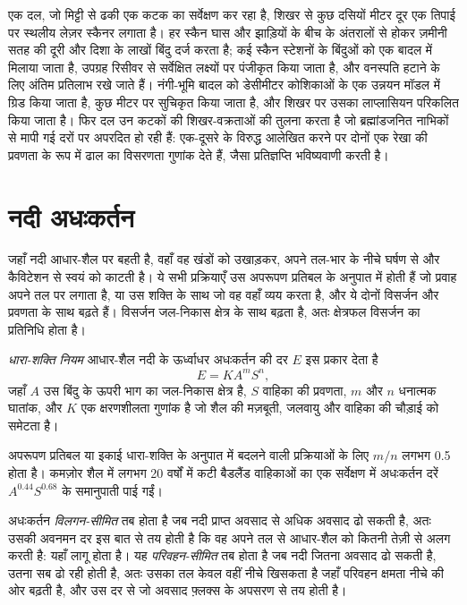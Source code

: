 \begin{inthefield}[एक ढाल का स्कैन]
एक दल, जो मिट्टी से ढकी एक कटक का सर्वेक्षण कर रहा है, शिखर से कुछ दसियों
मीटर दूर एक तिपाई पर स्थलीय लेज़र स्कैनर लगाता है। हर स्कैन घास और झाड़ियों के बीच के
अंतरालों से होकर ज़मीनी सतह की दूरी और दिशा के लाखों बिंदु दर्ज करता है;
कई स्कैन स्टेशनों के बिंदुओं को एक बादल में मिलाया जाता है,
उपग्रह रिसीवर से सर्वेक्षित लक्ष्यों पर पंजीकृत किया जाता है,
और वनस्पति हटाने के लिए अंतिम प्रतिलाभ रखे जाते हैं। नंगी-भूमि बादल को
डेसीमीटर कोशिकाओं के एक उन्नयन मॉडल में ग्रिड किया जाता है, कुछ मीटर पर सुचिकृत किया जाता है,
और शिखर पर उसका लाप्लासियन परिकलित किया जाता है। फिर दल उन कटकों की शिखर-वक्रताओं की
तुलना करता है जो ब्रह्मांडजनित नाभिकों से मापी गई दरों पर अपरदित हो रही हैं:
एक-दूसरे के विरुद्ध आलेखित करने पर दोनों एक रेखा की प्रवणता के रूप में
ढाल का विसरणता गुणांक देते हैं, जैसा प्रतिज्ञप्ति भविष्यवाणी करती है।
\end{inthefield}

\section{नदी अधःकर्तन}\label{sec:b3:quantitative-geomorphology:rivers}

जहाँ नदी आधार-शैल पर बहती है, वहाँ वह खंडों को उखाड़कर, अपने तल-भार के नीचे
घर्षण से और कैविटेशन से स्वयं को काटती है। ये सभी प्रक्रियाएँ उस अपरूपण प्रतिबल
के अनुपात में होती हैं जो प्रवाह अपने तल पर लगाता है, या उस शक्ति के साथ
जो वह वहाँ व्यय करता है, और ये दोनों विसर्जन और प्रवणता के साथ बढ़ते हैं।
विसर्जन जल-निकास क्षेत्र के साथ बढ़ता है, अतः क्षेत्रफल विसर्जन का प्रतिनिधि होता है।

\begin{definition}[धारा-शक्ति नियम]\label{def:b3:quantitative-geomorphology:stream-power}
\emph{धारा-शक्ति नियम} आधार-शैल नदी के ऊर्ध्वाधर अधःकर्तन की
दर $E$ इस प्रकार देता है
\[
E = K A^m S^n ,
\]
जहाँ $A$ उस बिंदु के ऊपरी भाग का जल-निकास क्षेत्र है,
$S$ वाहिका की प्रवणता, $m$ और $n$ धनात्मक घातांक,
और $K$ एक क्षरणशीलता गुणांक है जो शैल की मज़बूती, जलवायु और वाहिका की चौड़ाई को समेटता है।
\end{definition}

अपरूपण प्रतिबल या इकाई धारा-शक्ति के अनुपात में बदलने वाली प्रक्रियाओं के लिए
$m/n$ लगभग 0.5 होता है। कमज़ोर शैल में लगभग 20 वर्षों में कटी बैडलैंड वाहिकाओं का एक सर्वेक्षण
में अधःकर्तन दरें $A^{0.44}S^{0.68}$ के समानुपाती पाई गईं।

\begin{definition}\label{def:b3:quantitative-geomorphology:limited}
अधःकर्तन \emph{विलगन-सीमित} तब होता है जब
नदी प्राप्त अवसाद से अधिक अवसाद ढो सकती है,
अतः उसकी अवनमन दर इस बात से तय होती है
कि वह अपने तल से आधार-शैल को कितनी तेज़ी से अलग करती है:
यहाँ  लागू होता है। यह \emph{परिवहन-सीमित} तब होता है
जब नदी जितना अवसाद ढो सकती है, उतना सब ढो रही होती है,
अतः उसका तल केवल वहीं नीचे खिसकता है जहाँ परिवहन क्षमता नीचे की ओर बढ़ती है,
और उस दर से जो अवसाद फ़्लक्स के अपसरण से तय होती है।
\end{definition}


